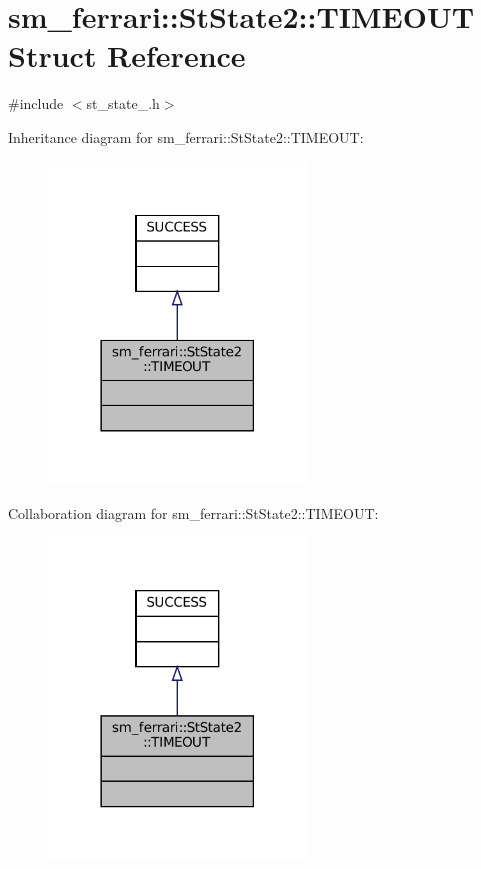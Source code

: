 \hypertarget{structsm__ferrari_1_1StState2_1_1TIMEOUT}{}\section{sm\+\_\+ferrari\+:\+:St\+State2\+:\+:T\+I\+M\+E\+O\+UT Struct Reference}
\label{structsm__ferrari_1_1StState2_1_1TIMEOUT}


{\ttfamily \#include $<$st\+\_\+state\+\_.\+h$>$}



Inheritance diagram for sm\+\_\+ferrari\+:\+:St\+State2\+:\+:T\+I\+M\+E\+O\+UT\+:
\nopagebreak
\begin{figure}[H]
\begin{center}
\leavevmode
\includegraphics[width=194pt]{structsm__ferrari_1_1StState2_1_1TIMEOUT__inherit__graph}
\end{center}
\end{figure}


Collaboration diagram for sm\+\_\+ferrari\+:\+:St\+State2\+:\+:T\+I\+M\+E\+O\+UT\+:
\nopagebreak
\begin{figure}[H]
\begin{center}
\leavevmode
\includegraphics[width=194pt]{structsm__ferrari_1_1StState2_1_1TIMEOUT__coll__graph}
\end{center}
\end{figure}


